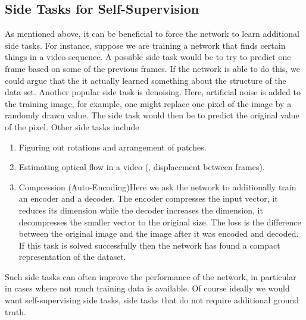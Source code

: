 \subsection*{Side Tasks for Self-Supervision}
As mentioned above, it can be beneficial to force the network to learn
additional side tasks.  For instance, suppose we are training a network that
finds certain things in a video sequence.  A possible side task would be to try
to predict one frame based on some of the previous frames. If the network is
able to do this, we could argue that the it actually learned something about the
structure of the data set. Another popular side task is denoising. Here,
artificial noise is added to the training image, for example, one might replace
one pixel of the image by a randomly drawn value. The side task would then be to
predict the original value of the pixel. Other side tasks include
\begin{enumerate}
\item Figuring out rotations and arrangement of patches.
\item Estimating optical flow in a video (\ie, displacement between frames).
\item Compression (Auto-Encoding)\qquad Here we ask the network to additionally
  train an encoder and a decoder. The encoder compresses the input vector, \ie
  it reduces its dimension while the decoder increases the dimension, \ie it
  decompresses the smaller vector to the original size. The loss is the
  difference between the original image and the image after it was encoded and
  decoded. If this task is solved successfully then the network has found a
  compact representation of the dataset.
\end{enumerate}
Such side tasks can often improve the performance of the network, in particular
in cases where not much training data is available. Of course ideally we would
want self-supervising side tasks, \ie side tasks that do not require additional
ground truth.

